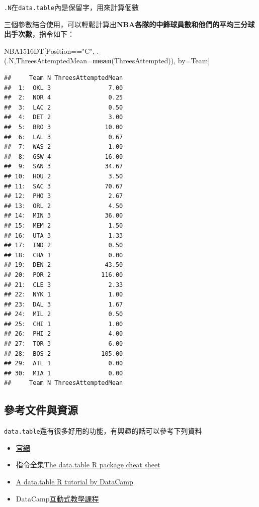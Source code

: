 \documentclass[]{book}
\newenvironment{Shaded}{\begin{snugshade}}{\end{snugshade}}
\newcommand{\KeywordTok}[1]{\textcolor[rgb]{0.13,0.29,0.53}{\textbf{{#1}}}}
\newcommand{\DataTypeTok}[1]{\textcolor[rgb]{0.13,0.29,0.53}{{#1}}}
\newcommand{\StringTok}[1]{\textcolor[rgb]{0.31,0.60,0.02}{{#1}}}
\newcommand{\NormalTok}[1]{{#1}}
\providecommand{\tightlist}{%
  \setlength{\itemsep}{0pt}\setlength{\parskip}{0pt}}
\theoremstyle{definition}
\theoremstyle{definition}
\theoremstyle{remark}
\begin{document}
\texttt{.N}在\texttt{data.table}內是保留字，用來計算個數

三個參數結合使用，可以輕鬆計算出\textbf{NBA各隊的中鋒球員數和他們的平均三分球出手次數}，指令如下：

\begin{Shaded}
\begin{Highlighting}[]
\NormalTok{NBA1516DT[Position==}\StringTok{"C"}\NormalTok{,}
          \NormalTok{.(.N,}\DataTypeTok{ThreesAttemptedMean=}\KeywordTok{mean}\NormalTok{(ThreesAttempted)),}
          \NormalTok{by=Team]}
\end{Highlighting}
\end{Shaded}

\begin{verbatim}
##     Team N ThreesAttemptedMean
##  1:  OKL 3                7.00
##  2:  NOR 4                0.25
##  3:  LAC 2                0.50
##  4:  DET 2                3.00
##  5:  BRO 3               10.00
##  6:  LAL 3                0.67
##  7:  WAS 2                1.00
##  8:  GSW 4               16.00
##  9:  SAN 3               34.67
## 10:  HOU 2                3.50
## 11:  SAC 3               70.67
## 12:  PHO 3                2.67
## 13:  ORL 2                4.50
## 14:  MIN 3               36.00
## 15:  MEM 2                1.50
## 16:  UTA 3                1.33
## 17:  IND 2                0.50
## 18:  CHA 1                0.00
## 19:  DEN 2               43.50
## 20:  POR 2              116.00
## 21:  CLE 3                2.33
## 22:  NYK 1                1.00
## 23:  DAL 3                1.67
## 24:  MIL 2                0.50
## 25:  CHI 1                1.00
## 26:  PHI 2                4.00
## 27:  TOR 3                6.00
## 28:  BOS 2              105.00
## 29:  ATL 1                0.00
## 30:  MIA 1                0.00
##     Team N ThreesAttemptedMean
\end{verbatim}

\subsection{參考文件與資源}

\texttt{data.table}還有很多好用的功能，有興趣的話可以參考下列資料

\begin{itemize}
\tightlist
\item
  \href{https://github.com/Rdatatable/data.table/wiki}{官網}
\item
  指令全集\href{https://s3.amazonaws.com/assets.datacamp.com/img/blog/data+table+cheat+sheet.pdf}{The
  data.table R package cheat sheet}
\item
  \href{https://www.datacamp.com/community/tutorials/data-table-r-tutorial\#gs.vzMYa_k}{A
  data.table R tutorial by DataCamp}
\item
  DataCamp\href{https://www.datacamp.com/courses/data-table-data-manipulation-r-tutorial}{互動式教學課程}
\end{itemize}
\end{document}
